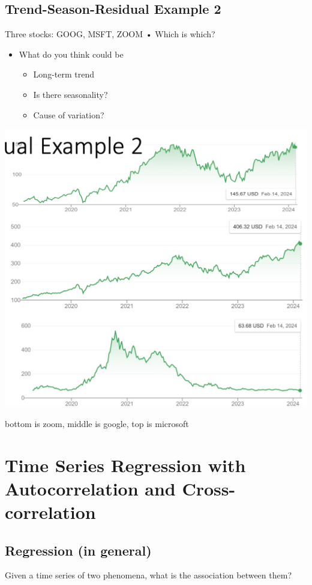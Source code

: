 \documentclass[11pt]{article}
\theoremstyle{definition}
\begin{document}
\subsection{Trend-Season-Residual Example 2}
Three stocks: GOOG,
MSFT, ZOOM
• Which is which?

\begin{itemize}
  \item What do you think
  could be
  \begin{itemize}
    \item Long-term trend
    \item Is there seasonality?
    \item Cause of variation?
  \end{itemize}
\end{itemize}

\includegraphics[width=\textwidth/4]{4.png}

bottom is zoom, middle is google, top is microsoft

\section{Time Series Regression with
Autocorrelation and
Cross-correlation}
\subsection{Regression (in general)}
Given a time series of two phenomena, what is the association
between them?
\end{document}
